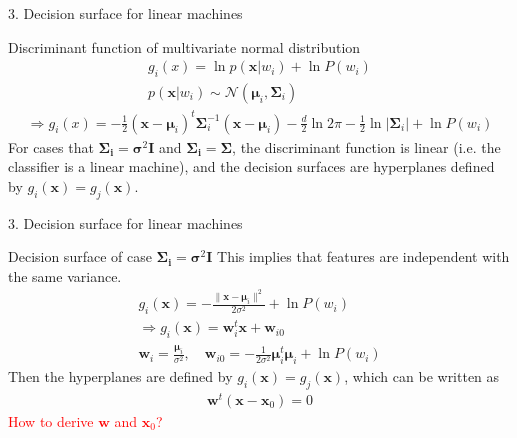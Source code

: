 \documentclass[compress,blue]{beamer}
\begin{document}
\begin{frame}{3. Decision surface for linear machines}
	\begin{block}{Discriminant function of multivariate normal distribution}
		\begin{align}
			g_i(x) = \ln p(\mathbf{x} | w_i) + \ln P(w_i) \\
			p(\mathbf{x} | w_i) \sim \mathcal{N}(\mathbf{\mu}_i, \mathbf{\Sigma}_i) \qquad
		\end{align}
		\pause
		\small
		\begin{align}
			\Rightarrow g_i(x) = -\frac{1}{2}(\mathbf{x} - \mathbf{\mu}_i)^t\mathbf{\Sigma}_i^{-1}(\mathbf{x} - \mathbf{\mu}_i) - \frac{d}{2}\ln 2\pi - \frac{1}{2}\ln |\mathbf{\Sigma}_i| + \ln P(w_i)\nonumber
		\end{align}
		\normalsize
		\pause
		For cases that $\mathbf{\Sigma_i} = \mathbf{\sigma}^2\mathbf{I}$ and $\mathbf{\Sigma_i} = \mathbf{\Sigma}$, the discriminant function is linear (i.e. the classifier is a linear machine), and the decision surfaces are hyperplanes defined by $g_i(\mathbf{x}) = g_j(\mathbf{x})$.
	\end{block}
\end{frame}

\begin{frame}{3. Decision surface for linear machines}
	\begin{block}{Decision surface of case $\mathbf{\Sigma_i} = \mathbf{\sigma}^2\mathbf{I}$}
		\pause
		This implies that features are independent with the same variance.
		\begin{align}
			g_i(\mathbf{x}) = -\frac{\|\mathbf{x} - \mathbf{\mu}_i\|^2}{2\sigma^2} + \ln P(w_i) \qquad\\
			\Rightarrow 
			g_i(\mathbf{x}) = \mathbf{w}_i^t\mathbf{x} + \mathbf{w}_{i0} \qquad\qquad\\
			\mathbf{w}_i = \frac{\mathbf{\mu}_i}{\sigma^2}, \quad \mathbf{w}_{i0} = -\frac{1}{2\sigma^2}\mathbf{\mu}_i^t\mathbf{\mu}_i + \ln P(w_i)
		\end{align}
		\pause
		Then the hyperplanes are defined by $g_i(\mathbf{x}) = g_j(\mathbf{x})$, which can be written as
		\begin{align}
			\mathbf{w}^t(\mathbf{x} - \mathbf{x}_0) = 0
		\end{align}
		\pause
		\textcolor{red}{How to derive $\mathbf{w}$ and $\mathbf{x}_0$?}
	\end{block}
\end{frame}
\end{document}
